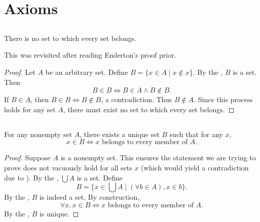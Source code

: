 \documentclass{report}
\begin{document}
\section{Axioms}%

\subsection{}%

\begin{theorem}[2A]

  There is no set to which every set belongs.

  \begin{note}
    This was revisited after reading Enderton's proof prior.
  \end{note}

\end{theorem}

\begin{proof}

  Let $A$ be an arbitrary set.
  Define $B = \{ x \in A \mid x \not\in x \}$.
  By the , $B$ is a set.
  Then $$B \in B \iff B \in A \land B \not\in B.$$
  If $B \in A$, then $B \in B \iff B \not\in B$, a contradiction.
  Thus $B \not\in A$.
  Since this process holds for any set $A$, there must exist no set to which
    every set belongs.

\end{proof}

\subsection{}%

\begin{theorem}[2B]

  For any nonempty set $A$, there exists a unique set $B$ such that for any
    $x$, $$x \in B \iff x \text{ belongs to every member of } A.$$

\end{theorem}

\begin{proof}

  Suppose $A$ is a nonempty set.
  This ensures the statement we are trying to prove does not vacuously hold for
    all sets $x$ (which would yield a contradiction due to
    ).
  By the , $\bigcup A$ is a set.
  Define $$B = \{ x \in \bigcup A \mid (\forall b \in A), x \in b \}.$$
  By the , $B$ is indeed a set.
  By construction,
    $$\forall x, x \in B \iff x \text{ belongs to every member of } A.$$
  By the , $B$ is unique.

\end{proof}
\end{document}
